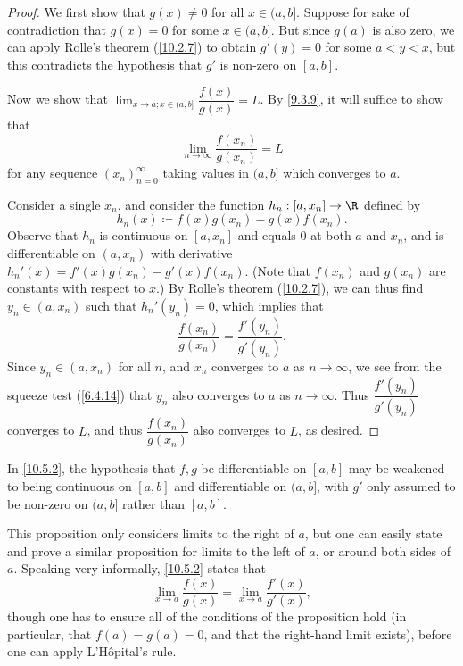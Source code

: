 \begin{proof}
  We first show that \(g(x) \neq 0\) for all \(x \in (a, b]\).
  Suppose for sake of contradiction that \(g(x) = 0\) for some \(x \in (a, b]\).
  But since \(g(a)\) is also zero, we can apply Rolle's theorem (\cref{10.2.7}) to obtain \(g'(y) = 0\) for some \(a < y < x\), but this contradicts the hypothesis that \(g'\) is non-zero on \([a, b]\).

  Now we show that \(\lim_{x \to a ; x \in (a, b]} \dfrac{f(x)}{g(x)} = L\).
  By \cref{9.3.9}, it will suffice to show that
  \[
    \lim_{n \to \infty} \dfrac{f(x_n)}{g(x_n)} = L
  \]
  for any sequence \((x_n)_{n = 0}^\infty\) taking values in \((a, b]\) which converges to \(a\).

  Consider a single \(x_n\), and consider the function \(h_n : [a, x_n] \to \R\) defined by
  \[
    h_n(x) \coloneqq f(x) g(x_n) - g(x) f(x_n).
  \]
  Observe that \(h_n\) is continuous on \([a, x_n]\) and equals \(0\) at both \(a\) and \(x_n\), and is differentiable on \((a, x_n)\) with derivative \(h_n'(x) = f'(x) g(x_n) - g'(x) f(x_n)\).
  (Note that \(f(x_n)\) and \(g(x_n)\) are constants with respect to \(x\).)
  By Rolle's theorem (\cref{10.2.7}), we can thus find \(y_n \in (a, x_n)\) such that \(h_n'(y_n) = 0\), which implies that
  \[
    \dfrac{f(x_n)}{g(x_n)} = \dfrac{f'(y_n)}{g'(y_n)}.
  \]
  Since \(y_n \in (a, x_n)\) for all \(n\), and \(x_n\) converges to \(a\) as \(n \to \infty\), we see from the squeeze test (\cref{6.4.14}) that \(y_n\) also converges to \(a\) as \(n \to \infty\).
  Thus \(\dfrac{f'(y_n)}{g'(y_n)}\) converges to \(L\), and thus \(\dfrac{f(x_n)}{g(x_n)}\) also converges to \(L\), as desired.
\end{proof}

\begin{note}
  In \cref{10.5.2}, the hypothesis that \(f, g\) be differentiable on \([a, b]\) may be weakened to being continuous on \([a, b]\) and differentiable on \((a, b]\), with \(g'\) only assumed to be non-zero on \((a, b]\) rather than \([a, b]\).
\end{note}

\begin{rmk}\label{10.5.3}
  This proposition only considers limits to the right of \(a\), but one can easily state and prove a similar proposition for limits to the left of \(a\), or around both sides of \(a\).
  Speaking very informally, \cref{10.5.2} states that
  \[
    \lim_{x \to a} \dfrac{f(x)}{g(x)} = \lim_{x \to a} \dfrac{f'(x)}{g'(x)},
  \]
  though one has to ensure all of the conditions of the proposition hold (in particular, that \(f(a) = g(a) = 0\), and that the right-hand limit exists), before one can apply L'Hôpital's rule.
\end{rmk}

